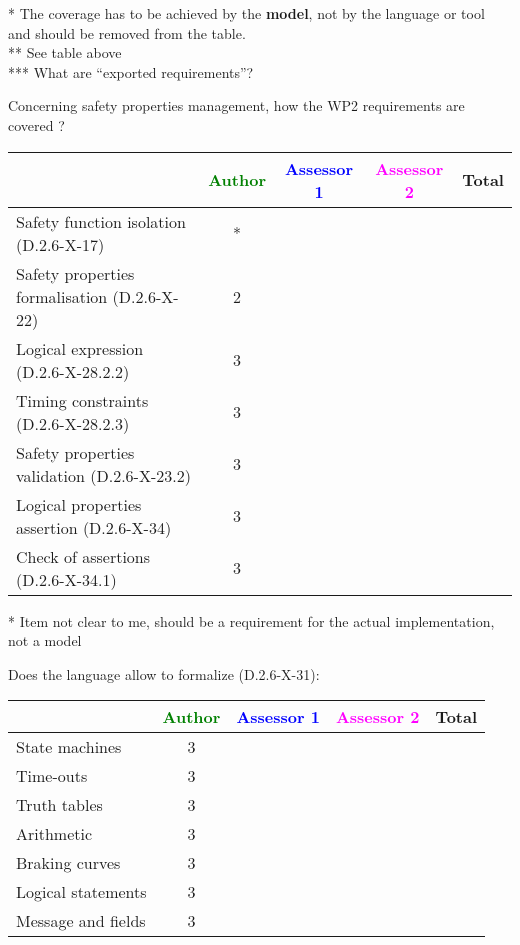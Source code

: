 \begin{author_comment}
* The coverage has to be achieved by the \textbf{model}, not by the language or tool and should be removed from the table.\\
** See table above\\
*** What are ``exported requirements''?\\
\end{author_comment}

Concerning safety properties management, how the WP2 requirements are covered ?

\begin{tabular}{|l | c | c | c | c|}
\hline
& \textcolor{green}{Author} & \textcolor{blue}{Assessor 1} & \textcolor{magenta}{Assessor 2} & Total \\
\hline 
Safety function isolation (D.2.6-X-17)  &* & & &  \\
\hline 
Safety properties formalisation (D.2.6-X-22)  &2 & & &  \\
\hline
Logical expression (D.2.6-X-28.2.2)  &3 & & &  \\
\hline
Timing constraints (D.2.6-X-28.2.3)  &3 & & &  \\
\hline
Safety properties validation (D.2.6-X-23.2)  &3 & & &  \\
\hline
Logical properties assertion (D.2.6-X-34)  &3 & & &  \\
\hline
Check  of assertions (D.2.6-X-34.1)  &3 & & &  \\
\hline
\end{tabular}

\begin{author_comment}
* Item not clear to me, should be a requirement for the actual implementation, not a model
\end{author_comment}

Does the language allow to  formalize (D.2.6-X-31):

\begin{tabular}{|l | c | c | c | c|}
\hline
& \textcolor{green}{Author} & \textcolor{blue}{Assessor 1} & \textcolor{magenta}{Assessor 2} & Total \\
\hline 
State machines  &3 & & &  \\
\hline
Time-outs  &3 & & &  \\
\hline
Truth tables  &3 & & &  \\
\hline
Arithmetic  &3 & & &  \\
\hline
Braking curves  &3 & & &  \\
\hline
Logical statements &3 & & &  \\
\hline
Message and fields &3 & & &  \\
\hline
\end{tabular}


